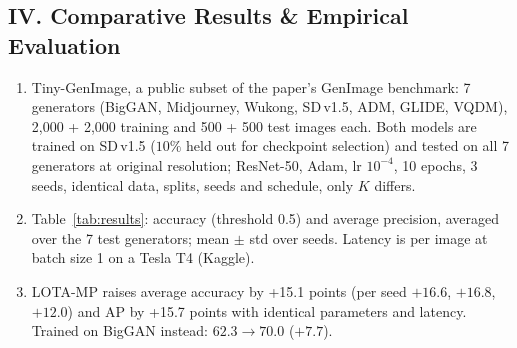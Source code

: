 \documentclass[8pt,a4paper]{article}
\newcommand{\NumSeeds}{3}
\newcommand{\DeltaAcc}{+15.1}
\newcommand{\DeltaAP}{+15.7}
\begin{document}
\subsection*{IV. Comparative Results \& Empirical Evaluation}
\begin{enumerate}
    \item Tiny-GenImage, a public subset of the paper's GenImage benchmark: 7 generators (BigGAN, Midjourney, Wukong, SD\,v1.5, ADM, GLIDE, VQDM), 2{,}000 + 2{,}000 training and 500 + 500 test images each. Both models are trained on SD\,v1.5 ($10\%$ held out for checkpoint selection) and tested on all 7 generators at original resolution; ResNet-50, Adam, lr $10^{-4}$, 10 epochs, \NumSeeds{} seeds, identical data, splits, seeds and schedule, only $K$ differs.
    \item Table~\ref{tab:results}: accuracy (threshold 0.5) and average precision, averaged over the 7 test generators; mean $\pm$ std over seeds. Latency is per image at batch size 1 on a Tesla T4 (Kaggle).
    \item LOTA-MP raises average accuracy by \DeltaAcc{} points (per seed $+16.6$, $+16.8$, $+12.0$) and AP by \DeltaAP{} points with identical parameters and latency. Trained on BigGAN instead: $62.3\to70.0$ ($+7.7$).
\end{enumerate}
\end{document}

